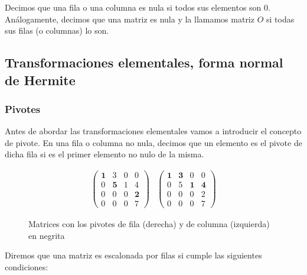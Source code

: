 Decimos que una fila o una columna es nula si todos sus elementos son 0.
Análogamente, decimos que una matriz es nula y la llamamos matriz $O$ si todas sus filas (o columnas) lo son.

\subsection{Transformaciones elementales, forma normal de Hermite}\label{transformaciones-elementales-forma-normal-de-hermite}

\subsubsection{Pivotes}

Antes de abordar las transformaciones elementales vamos a introducir el concepto de pivote.
En una fila o columna no nula, decimos que un elemento es el pivote de dicha fila si es el primer elemento no nulo de la misma.

\begin{figure}[h!]
\[
	\begin{array}{cc}
		\begin{pmatrix}
			\boldsymbol{1} & 3              & 0              & 0              \\
			0              & \boldsymbol{5} & 1              & 4              \\
			0              & 0              & 0              & \boldsymbol{2} \\
			0              & 0              & 0              & 7
		\end{pmatrix}

		&

		\begin{pmatrix}
			\boldsymbol{1} & \boldsymbol{3} & 0              & 0              \\
			0              & 5              & \boldsymbol{1} & \boldsymbol{4} \\
			0              & 0              & 0              & 2              \\
			0              & 0              & 0              & 7
		\end{pmatrix}
	\end{array}
\]
\caption{Matrices con los pivotes de fila (derecha) y de columna (izquierda) en negrita}
\end{figure}

Diremos que una matriz es escalonada por filas si cumple las siguientes condiciones:

